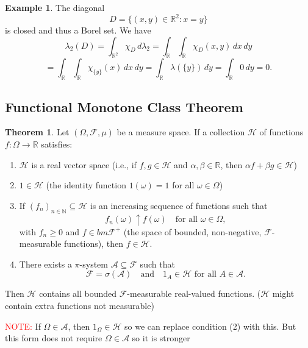 \documentclass[11pt,a4paper]{article}
\theoremstyle{definition}
\newtheorem{theorem}{Theorem}[section]
\newtheorem{example}{Example}[section]
\begin{document}
\begin{example}
The diagonal 
\[
D = \{(x,y) \in \mathbb{R}^2 : x = y\}
\]
is closed and thus a Borel set. We have
\[
\lambda_2(D)
= \int_{\mathbb{R}^2} \chi_D \, d\lambda_2
= \int_{\mathbb{R}} \int_{\mathbb{R}} \chi_D(x,y)\, dx \, dy
\]
\[
= \int_{\mathbb{R}} \int_{\mathbb{R}} \chi_{\{y\}}(x)\, dx \, dy
= \int_{\mathbb{R}} \lambda(\{y\})\, dy
= \int_{\mathbb{R}} 0 \, dy
= 0.
\]
\end{example}

\subsection{Functional Monotone Class Theorem}

\begin{theorem}
Let $(\Omega, \mathcal{F}, \mu)$ be a measure space. If a collection $\mathcal{H}$ of functions $f : \Omega \to \mathbb{R}$ satisfies:
\begin{enumerate}
\item $\mathcal{H}$ is a real vector space (i.e., if $f,g \in \mathcal{H}$ and $\alpha, \beta \in \mathbb{R}$, then $\alpha f + \beta g \in \mathcal{H}$) 
\item $1 \in \mathcal{H}$ (the identity function $1(\omega) = 1$ for all $\omega \in \Omega$)
\item If $(f_n)_{n \in \mathbb{N}} \subseteq \mathcal{H}$ is an increasing sequence of functions such that
    \[
    f_n(\omega) \uparrow f(\omega) \quad \text{for all } \omega \in \Omega,
    \]
    with $f_n \ge 0$ and $f \in bm\mathcal{F}^+$ (the space of bounded, non-negative, $\mathcal{F}$-measurable functions), then $f \in \mathcal{H}$.
\item There exists a $\pi$-system $\mathcal{A} \subseteq \mathcal{F}$ such that
    \[
    \mathcal{F} = \sigma(\mathcal{A}) \quad \text{and} \quad 1_A \in \mathcal{H} \text{ for all } A \in \mathcal{A}.
    \]
\end{enumerate}
Then $\mathcal{H}$ contains all bounded $\mathcal{F}$-measurable real-valued functions. ($\mathcal{H}$ might contain extra functions not measurable)
\end{theorem}
\noindent \textcolor{red}{NOTE:} If $\Omega \in \mathcal{A}$, then $1_{\Omega} \in \mathcal{H}$ so we can replace condition (2) with this. But this form does not require $\Omega \in \mathcal{A}$ so it is stronger
\end{document}

